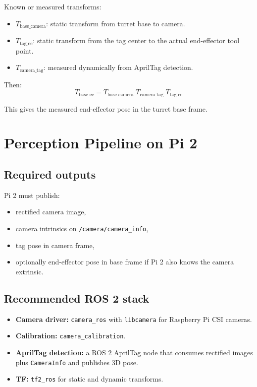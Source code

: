 \documentclass[11pt]{article}
\begin{document}
Known or measured transforms:
\begin{itemize}[leftmargin=1.5em]
  \item \(T_{\text{base}\_\text{camera}}\): static transform from turret base to camera.
  \item \(T_{\text{tag}\_\text{ee}}\): static transform from the tag center to the actual end-effector tool point.
  \item \(T_{\text{camera}\_\text{tag}}\): measured dynamically from AprilTag detection.
\end{itemize}

Then:
\[
T_{\text{base}\_\text{ee}} =
T_{\text{base}\_\text{camera}}
\; T_{\text{camera}\_\text{tag}}
\; T_{\text{tag}\_\text{ee}}
\]

This gives the measured end-effector pose in the turret base frame.

\section*{Perception Pipeline on Pi 2}
\subsection*{Required outputs}
Pi 2 must publish:
\begin{itemize}[leftmargin=1.5em]
  \item rectified camera image,
  \item camera intrinsics on \texttt{/camera/camera\_info},
  \item tag pose in camera frame,
  \item optionally end-effector pose in base frame if Pi 2 also knows the camera extrinsic.
\end{itemize}

\subsection*{Recommended ROS 2 stack}
\begin{itemize}[leftmargin=1.5em]
  \item \textbf{Camera driver:} \texttt{camera\_ros} with \texttt{libcamera} for Raspberry Pi CSI cameras.
  \item \textbf{Calibration:} \texttt{camera\_calibration}.
  \item \textbf{AprilTag detection:} a ROS 2 AprilTag node that consumes rectified images plus \texttt{CameraInfo} and publishes 3D pose.
  \item \textbf{TF:} \texttt{tf2\_ros} for static and dynamic transforms.
\end{itemize}
\end{document}
